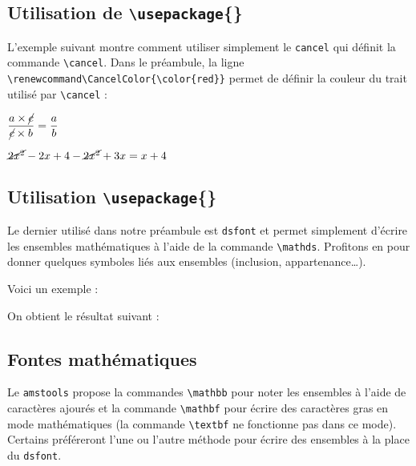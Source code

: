 \subsection{Utilisation de \texttt{\textbackslash usepackage}\{\}}

L'exemple suivant montre comment utiliser simplement le  \texttt{cancel} qui définit la commande \texttt{\textbackslash cancel}. Dans le préambule, la ligne \verb!\renewcommand\CancelColor{\color{red}}! permet de définir la couleur du trait utilisé par \texttt{\textbackslash cancel} :\bigskip

{\everymath{\textstyle}
\begin{SideBySideExample}
    $\dfrac{a \times \cancel{c}}{\cancel{c}\times b}
    = \dfrac a b$\par\medskip
    $\cancel{2x^2}-2x+4-\cancel{2x^2}+3x=x+4$
\end{SideBySideExample}
}

\subsection{Utilisation \texttt{\textbackslash usepackage}\{\}}

Le dernier  utilisé dans notre préambule est \texttt{dsfont} et permet simplement d'écrire les ensembles mathématiques à l'aide de la commande \texttt{\textbackslash mathds}. Profitons en pour donner quelques symboles liés aux ensembles (inclusion, appartenance\dots). 

Voici un exemple :


On obtient le résultat suivant :



\subsection{Fontes mathématiques}

Le  \texttt{amstools} propose la commandes \texttt{\textbackslash mathbb} pour noter les ensembles à l'aide de caractères ajourés et la commande \texttt{\textbackslash mathbf} pour écrire des caractères gras en mode mathématiques (la commande \texttt{\textbackslash textbf} ne fonctionne pas dans ce mode). Certains préféreront l'une ou l'autre méthode pour écrire des ensembles à la place du  \texttt{dsfont}.\bigskip

